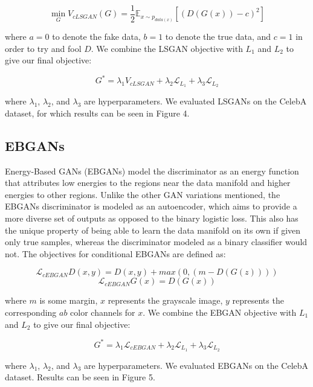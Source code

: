 \documentclass[10pt]{article}
\begin{document}
\[\min\limits_{G} V_{cLSGAN}(G) = \frac{1}{2} \mathbb{E}_{x \sim p_{data(x)}} [(D(G(x))-c)^2] \]

\noindent where $a=0$ to denote the fake data, $b=1$ to denote the true data, and $c=1$ in order to try and
fool $D$. We combine the LSGAN objective with $L_1$ and $L_2$ to give our final objective:

\[ G^* = \lambda_1 V_{cLSGAN} + \lambda_2 \mathcal{L}_{L_1} + \lambda_3 \mathcal{L}_{L_2} \]

\noindent where $\lambda_1$, $\lambda_2$, and $\lambda_3$ are hyperparameters. We evaluated LSGANs on
the CelebA dataset, for which results can be seen in Figure 4.

\subsection{EBGANs}
Energy-Based GANs (EBGANs) model the discriminator as an energy function that attributes low energies to
the regions near the data manifold and higher energies to other regions. Unlike the other GAN variations
mentioned, the EBGANs discriminator is modeled as an autoencoder, which aims to provide a more diverse
set of outputs as opposed to the binary logistic loss. This also has the unique property of being able to learn the data
manifold on its own if given only true samples, whereas the discriminator modeled as a binary classifier would not.
The objectives for conditional EBGANs are defined as:

\[\mathcal{L}_{cEBGAN} D(x,y) = D(x,y) + max(0, (m-D(G(z)))) \]
\[\mathcal{L}_{cEBGAN} G(x) = D(G(x)) \]


\noindent where $m$ is some margin, $x$ represents the grayscale image, $y$ represents the corresponding
$ab$ color channels for $x$. We combine the EBGAN objective with $L_1$ and $L_2$ to give our final objective:

\[ G^* = \lambda_1 \mathcal{L}_{cEBGAN} + \lambda_2 \mathcal{L}_{L_1} + \lambda_3 \mathcal{L}_{L_2} \]

\noindent where $\lambda_1$, $\lambda_2$, and $\lambda_3$ are hyperparameters. We evaluated EBGANs on
the CelebA dataset. Results can be seen in Figure 5.
\end{document}

